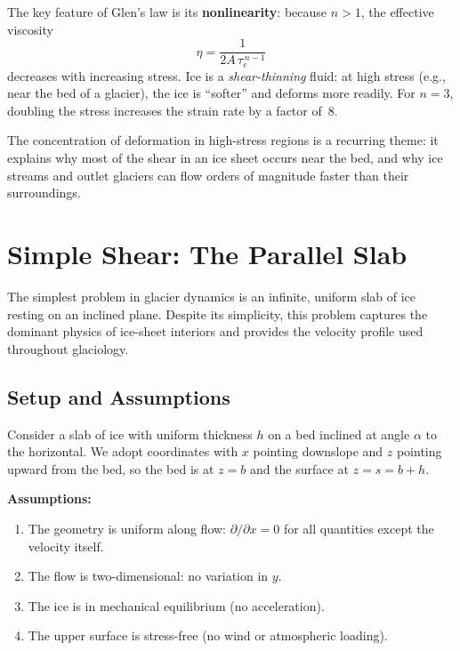 \documentclass[11pt]{article}
\begin{document}
\noindent The key feature of Glen's law is its \textbf{nonlinearity}: because $n > 1$, the effective viscosity
\begin{equation}
  \eta = \frac{1}{2A\,\tau_e^{\,n-1}}
  \label{eq:viscosity}
\end{equation}
decreases with increasing stress.  Ice is a \textit{shear-thinning} fluid: at high stress (e.g., near the bed of a glacier), the ice is ``softer'' and deforms more readily.  For $n = 3$, doubling the stress increases the strain rate by a factor of~8.


\medskip
\noindent The concentration of deformation in high-stress regions is a recurring theme: it explains why most of the shear in an ice sheet occurs near the bed, and why ice streams and outlet glaciers can flow orders of magnitude faster than their surroundings.

\section{Simple Shear: The Parallel Slab}
\label{sec:slab}

The simplest problem in glacier dynamics is an infinite, uniform slab of ice resting on an inclined plane.  Despite its simplicity, this problem captures the dominant physics of ice-sheet interiors and provides the velocity profile used throughout glaciology.

\subsection{Setup and Assumptions}

Consider a slab of ice with uniform thickness $h$ on a bed inclined at angle $\alpha$ to the horizontal.  We adopt coordinates with $x$ pointing downslope and $z$ pointing upward from the bed, so the bed is at $z = b$ and the surface at $z = s = b + h$.

\medskip
\noindent\textbf{Assumptions:}
\begin{enumerate}
  \item The geometry is uniform along flow: $\partial/\partial x = 0$ for all quantities except the velocity itself.
  \item The flow is two-dimensional: no variation in $y$.
  \item The ice is in mechanical equilibrium (no acceleration).
  \item The upper surface is stress-free (no wind or atmospheric loading).
\end{enumerate}
\end{document}
